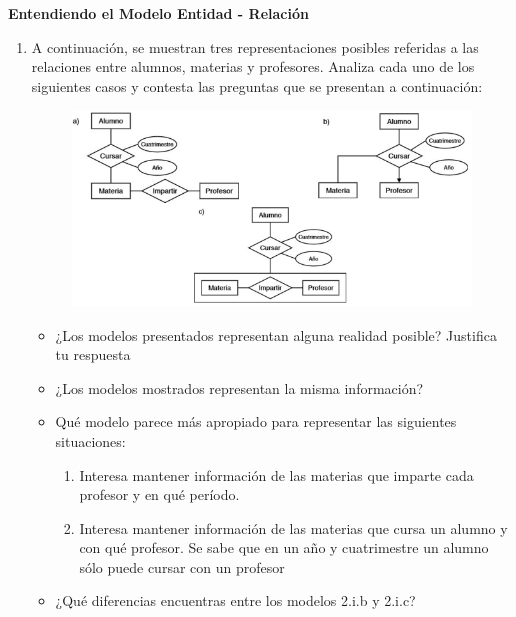 \documentclass{exam}
\begin{document}
\begin{questions}
	\question \textbf{Entendiendo el Modelo Entidad - Relación}
	\begin{enumerate}[label=\roman*.]
		\item A continuación, se muestran tres representaciones posibles referidas a las relaciones entre alumnos, materias y profesores. Analiza cada uno de los siguientes casos y contesta las preguntas que se presentan a continuación:
		\begin{figure}[h!]
			\includegraphics[scale=1]{pregunta_2_i.png}
		\centering
		\end{figure}
		\begin{itemize}
			\item ¿Los modelos presentados representan alguna realidad posible? Justifica tu respuesta
			\item ¿Los modelos mostrados representan la misma información?
			\item Qué modelo parece más apropiado para representar las siguientes situaciones:
			\begin{enumerate}[label=\arabic*.]
				\item Interesa mantener información de las materias que imparte cada profesor y en qué período.
				\item Interesa mantener información de las materias que cursa un alumno y con qué profesor. Se sabe que en un año y cuatrimestre un alumno sólo puede cursar con un profesor
			\end{enumerate}
			\item ¿Qué diferencias encuentras entre los modelos 2.i.b y 2.i.c?
		\end{itemize}
		

\end{enumerate}
\end{questions}
\end{document}
